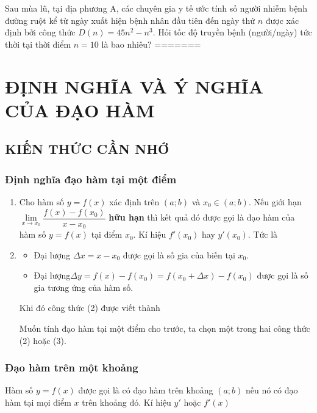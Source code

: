 \begin{bt}
	Sau mùa lũ, tại địa phương A, các chuyên gia y tế ước tính số người nhiễm bệnh đường ruột kể từ ngày xuất hiện bệnh nhân đầu tiên đến ngày thứ $n$ được xác định bởi công thức $D(n)=45n^2-n^3$. Hỏi tốc độ truyền bệnh (người/ngày) tức thời tại thời điểm $n=10$ là bao nhiêu?
=======
\setcounter{section}{30}\setcounter{dang}{0}
\section{ĐỊNH NGHĨA VÀ Ý NGHĨA CỦA ĐẠO HÀM}
\subsection{KIẾN THỨC CẦN NHỚ}
\subsubsection{Định nghĩa đạo hàm tại một điểm}
\begin{enumerate}[\iconMT]
	\item {} Cho hàm số $y=f(x)$ xác định trên $(a;b)$ và $x_0 \in (a;b)$. Nếu giới hạn $\lim\limits_{x\to x_0}\dfrac{f(x)-f(x_0)}{x-x_0}$ \textbf{hữu hạn} thì kết quả đó được gọi là đạo hàm của hàm số $y=f(x)$ tại điểm $x_0$. Kí hiệu $f'(x_0)$ hay $y'(x_0)$. Tức là
	\item {}
	\begin{itemize}
		\item Đại lượng $\Delta x =x-x_0$ được gọi là số gia của biến tại $x_0$.
		\item Đại lượng$\Delta y =f(x)-f(x_0)=f(x_0+\Delta x)-f(x_0)$ được gọi là số gia tương ứng của hàm số.
	\end{itemize}
	Khi đó công thức (2) được viết thành 
	\begin{note}
		Muốn tính đạo hàm tại một điểm cho trước, ta chọn một trong hai công thức (2) hoặc (3).
	\end{note}
\end{enumerate}

\subsubsection{Đạo hàm trên một khoảng}
Hàm số $y=f(x)$ được gọi là có đạo hàm trên khoảng $(a;b)$ nếu nó có đạo hàm tại mọi điểm  $x$ trên khoảng đó. Kí hiệu $y'$ hoặc $f'(x)$


\end{bt}
